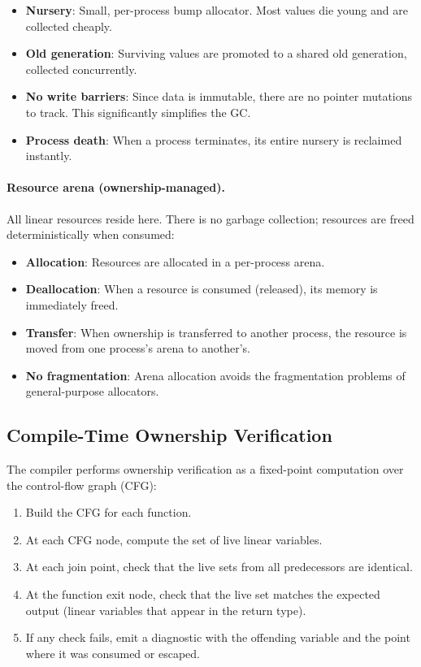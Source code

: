 \documentclass[11pt]{article}
\begin{document}
\begin{itemize}
  \item \textbf{Nursery}: Small, per-process bump allocator.  Most
        values die young and are collected cheaply.
  \item \textbf{Old generation}: Surviving values are promoted to a
        shared old generation, collected concurrently.
  \item \textbf{No write barriers}: Since data is immutable, there are
        no pointer mutations to track.  This significantly simplifies
        the GC.
  \item \textbf{Process death}: When a process terminates, its entire
        nursery is reclaimed instantly.
\end{itemize}

\paragraph{Resource arena (ownership-managed).}
All linear resources reside here.  There is no garbage collection;
resources are freed deterministically when consumed:

\begin{itemize}
  \item \textbf{Allocation}: Resources are allocated in a per-process
        arena.
  \item \textbf{Deallocation}: When a resource is consumed (released),
        its memory is immediately freed.
  \item \textbf{Transfer}: When ownership is transferred to another
        process, the resource is moved from one process's arena to
        another's.
  \item \textbf{No fragmentation}: Arena allocation avoids the
        fragmentation problems of general-purpose allocators.
\end{itemize}

\subsection{Compile-Time Ownership Verification}\label{sec:impl-verify}

The compiler performs ownership verification as a fixed-point
computation over the control-flow graph (CFG):

\begin{enumerate}
  \item Build the CFG for each function.
  \item At each CFG node, compute the set of live linear variables.
  \item At each join point, check that the live sets from all
        predecessors are identical.
  \item At the function exit node, check that the live set matches
        the expected output (linear variables that appear in the
        return type).
  \item If any check fails, emit a diagnostic with the offending
        variable and the point where it was consumed or escaped.
\end{enumerate}
\end{document}

